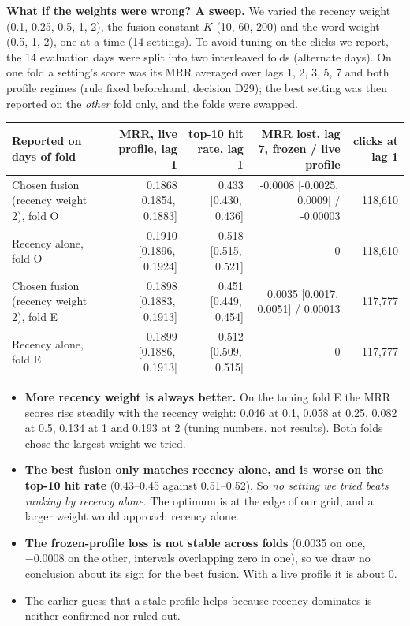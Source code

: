\documentclass[11pt,a4paper]{article}
\newcommand{\ci}[2]{[#1,\,#2]}
\begin{document}
\textbf{What if the weights were wrong? A sweep.} We varied the recency weight (0.1, 0.25, 0.5, 1, 2), the fusion constant $K$ (10, 60, 200) and the word weight (0.5, 1, 2), one at a time (14 settings). To avoid tuning on the clicks we report, the 14 evaluation days were split into two interleaved folds (alternate days). On one fold a setting's score was its MRR averaged over lags 1, 2, 3, 5, 7 and both profile regimes (rule fixed beforehand, decision D29); the best setting was then reported on the \emph{other} fold only, and the folds were swapped.
\begin{center}\scriptsize
\setlength{\tabcolsep}{3pt}
\begin{tabular}{@{}lrrrr@{}}
\toprule
Reported on days of fold & MRR, live profile, lag 1 & top-10 hit rate, lag 1 & MRR lost, lag 7, frozen / live profile & clicks at lag 1\\
\midrule
Chosen fusion (recency weight 2), fold O & 0.1868 \ci{0.1854}{0.1883} & 0.433 \ci{0.430}{0.436} & -0.0008 \ci{-0.0025}{0.0009} / -0.00003 & 118,610\\
Recency alone, fold O & 0.1910 \ci{0.1896}{0.1924} & 0.518 \ci{0.515}{0.521} & 0 & 118,610\\
Chosen fusion (recency weight 2), fold E & 0.1898 \ci{0.1883}{0.1913} & 0.451 \ci{0.449}{0.454} & 0.0035 \ci{0.0017}{0.0051} / 0.00013 & 117,777\\
Recency alone, fold E & 0.1899 \ci{0.1886}{0.1913} & 0.512 \ci{0.509}{0.515} & 0 & 117,777\\
\bottomrule
\end{tabular}
\end{center}
\begin{itemize}
\item \textbf{More recency weight is always better.} On the tuning fold E the MRR scores rise steadily with the recency weight: 0.046 at 0.1, 0.058 at 0.25, 0.082 at 0.5, 0.134 at 1 and 0.193 at 2 (tuning numbers, not results). Both folds chose the largest weight we tried.
\item \textbf{The best fusion only matches recency alone, and is worse on the top-10 hit rate} (0.43--0.45 against 0.51--0.52). So \emph{no setting we tried beats ranking by recency alone}. The optimum is at the edge of our grid, and a larger weight would approach recency alone.
\item \textbf{The frozen-profile loss is not stable across folds} (0.0035 on one, $-0.0008$ on the other, intervals overlapping zero in one), so we draw no conclusion about its sign for the best fusion. With a live profile it is about 0.
\item The earlier guess that a stale profile helps because recency dominates is neither confirmed nor ruled out.
\end{itemize}
\end{document}
